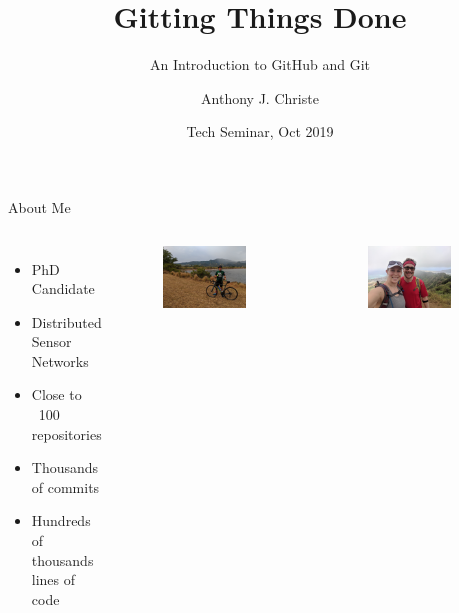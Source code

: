 \documentclass{beamer}
\title{Gitting Things Done}
\subtitle{An Introduction to GitHub and Git}
\author{Anthony J. Christe}
\date{Tech Seminar, Oct 2019}
\institute{PhD Candidate\\UH Manoa, ICS Department}
\begin{document}
    \maketitle

    \begin{frame}{About Me}
        \begin{columns}
            \begin{itemize}
                \item PhD Candidate
                \item Distributed Sensor Networks
                \item Close to ~100 repositories
                \item Thousands of commits
                \item Hundreds of thousands lines of code
            \end{itemize}

            \begin{figure}
                \centering
                \includegraphics[width=0.8\textwidth]{figures/me_bike.jpg}
            \end{figure}

            \begin{figure}
                \centering
                \includegraphics[width=0.8\textwidth]{figures/me_hike.jpg}
            \end{figure}

        \end{columns}
    \end{frame}
\end{document}
